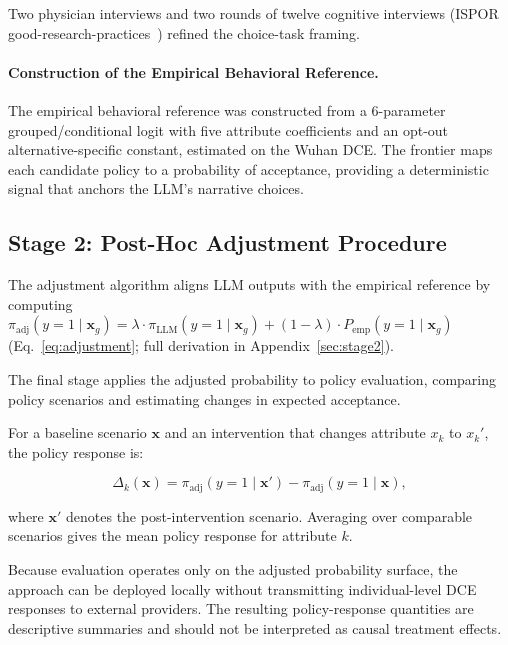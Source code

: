 \documentclass[11pt]{article}
\begin{document}
Two physician interviews and two rounds of twelve cognitive interviews (ISPOR good-research-practices~\citep{Johnson2013DCE,Bridges2013DCE}) refined the choice-task framing.

\paragraph{Construction of the Empirical Behavioral Reference.}

The empirical behavioral reference was constructed from a 6-parameter grouped/conditional logit with five attribute coefficients and an opt-out alternative-specific constant, estimated on the Wuhan DCE. The frontier maps each candidate policy to a probability of acceptance, providing a deterministic signal that anchors the LLM's narrative choices.

\subsection{Stage 2: Post-Hoc Adjustment Procedure} The adjustment algorithm aligns LLM outputs with the empirical reference by computing $\pi_{\mathrm{adj}}(y=1\mid\mathbf{x}_g) = \lambda \cdot \pi_{\mathrm{LLM}}(y=1\mid\mathbf{x}_g) + (1-\lambda) \cdot P_{\mathrm{emp}}(y=1\mid\mathbf{x}_g)$ (Eq.~\ref{eq:adjustment}; full derivation in Appendix~\ref{sec:stage2}).

\label{sec:stage3}

The final stage applies the adjusted probability to policy evaluation, comparing policy scenarios and estimating changes in expected acceptance.

For a baseline scenario $\mathbf{x}$ and an intervention that changes attribute $x_k$ to $x_k'$, the policy response is:

\[
\Delta_k(\mathbf{x}) = \pi_{\mathrm{adj}}(y=1\mid\mathbf{x}') - \pi_{\mathrm{adj}}(y=1\mid\mathbf{x}),
\]

where $\mathbf{x}'$ denotes the post-intervention scenario. Averaging over comparable scenarios gives the mean policy response for attribute $k$.

Because evaluation operates only on the adjusted probability surface, the approach can be deployed locally without transmitting individual-level DCE responses to external providers. The resulting policy-response quantities are descriptive summaries and should not be interpreted as causal treatment effects.



\clearpage
\end{document}
